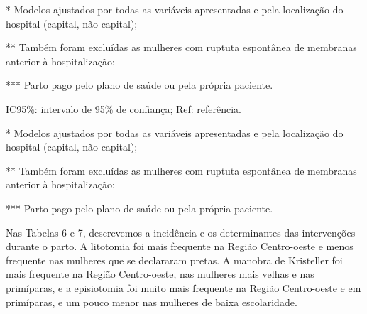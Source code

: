 \documentclass{article}
\begin{document}
* Modelos ajustados por todas as variáveis apresentadas e pela
localização do hospital (capital, não capital);

** Também foram excluídas as mulheres com ruptuta espontânea de
membranas anterior à hospitalização;

*** Parto pago pelo plano de saúde ou pela própria paciente.

IC95\%: intervalo de 95\% de confiança; Ref: referência.

* Modelos ajustados por todas as variáveis apresentadas e pela
localização do hospital (capital, não capital);

** Também foram excluídas as mulheres com ruptuta espontânea de
membranas anterior à hospitalização;

*** Parto pago pelo plano de saúde ou pela própria paciente.

Nas Tabelas 6 e 7, descrevemos a incidência e os determinantes das intervenções
durante o parto. A litotomia foi mais frequente na Região Centro-oeste e menos
frequente nas mulheres que se declararam pretas. A manobra de Kristeller foi
mais
frequente na Região Centro-oeste, nas mulheres mais velhas e nas primíparas, e a
episiotomia foi muito mais frequente na Região Centro-oeste e em primíparas, e
um
pouco menor nas mulheres de baixa escolaridade.
\end{document}
